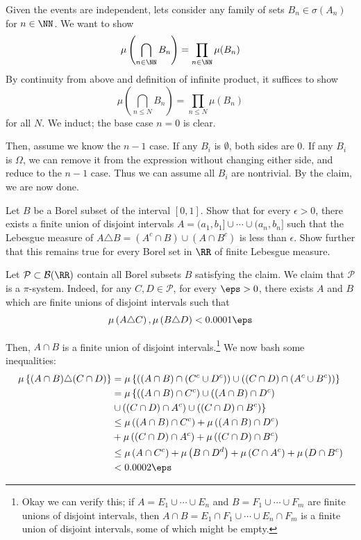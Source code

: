 \documentclass[11pt, headheight=30pt]{scrartcl}
\begin{document}
Given the events are independent, lets consider any family of
sets $B_n \in \sigma(A_n)$ for $n\in \NN$. We want to show
\[
    \mu\left(\bigcap_{n\in \NN} B_n\right) = \prod_{n \in \NN} \mu(B_n)
\]
By continuity from above and definition of infinite product,
it suffices to show
\[
    \mu\left(\bigcap_{n\leq N} B_n\right) = \prod_{n\leq N} \mu(B_n)    
\]
for all $N$. We induct; the base case $n = 0$ is clear.

Then, assume we know the $n-1$ case. If any $B_i$ is $\emptyset$,
both sides are $0$. If any $B_i$ is $\Omega$, we can remove
it from the expression without changing either side, and
reduce to the $n-1$ case. Thus we can assume all $B_i$ are
nontrivial. By the claim, we are now done.

\begin{prob}
    Let $B$ be a Borel subset of the interval $[0, 1]$.
    Show that for every $\epsilon > 0$, there exists a finite
    union of disjoint intervals $A = (a_1, b_1] \cup \cdots \cup (a_n, b_n]$
    such that the Lebesgue measure of $A \triangle B = (A^c \cap B) \cup (A \cap B^c)$
    is less than $\epsilon$.
    Show further that this remains true for every Borel set in $\RR$
    of finite Lebesgue measure.
\end{prob}

Let $\mathcal{P} \subset \mathcal{B}(\RR)$ contain all Borel subsets $B$ satisfying
the claim. We claim that $\mathcal{P}$ is a $\pi$-system. Indeed, for any
$C,D\in \mathcal{P}$, for every $\eps > 0$, there exists $A$ and $B$ which
are finite unions of disjoint intervals such that
\[
    \mu\left(A\triangle C\right), \mu\left(B\triangle D\right) < 0.0001\eps
\]

Then, $A\cap B$ is a finite union of disjoint intervals.\footnote{
    Okay we can verify this; if $A = E_1\cup \cdots \cup E_n$ and
    $B = F_1 \cup \cdots \cup F_m$ are finite unions of disjoint intervals,
    then $A\cap B = E_1\cap F_1 \cup \cdots \cup E_n\cap F_m$ is a finite
    union of disjoint intervals, some of which might be empty.
} We now bash some inequalities:
\begin{align*}
    \mu\left\{(A\cap B)\triangle (C\cap D)\right\} &= \mu\left\{\left((A\cap B)\cap (C^c\cup D^c)\right) \cup \left((C\cap D)\cap (A^c\cup B^c)\right)\right\}\\
    &= \mu\left\{\left((A\cap B)\cap C^c\right) \cup  \left((A\cap B)\cap D^c\right)\right.\\
    &\left.\cup \left((C\cap D)\cap A^c\right) \cup \left((C\cap D)\cap B^c\right)\right\}\\
    &\leq \mu\left((A\cap B)\cap C^c\right) + \mu\left((A\cap B)\cap D^c\right)\\
    &+ \mu\left((C\cap D)\cap A^c\right) + \mu\left((C\cap D)\cap B^c\right)\\
    &\leq \mu\left(A\cap C^c\right) + \mu\left(B\cap D^d\right) + \mu\left(C\cap A^c\right) + \mu\left(D\cap B^c\right)\\
    &< 0.0002\eps
\end{align*}
\end{document}
